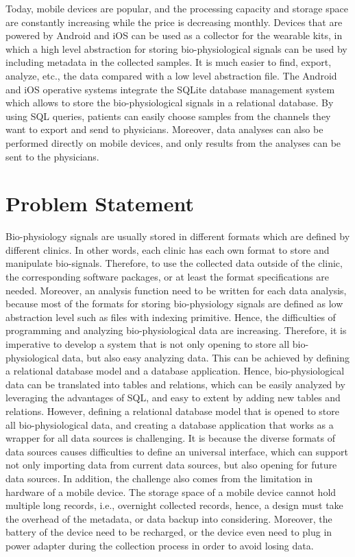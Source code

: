 Today, mobile devices are popular, and the processing capacity and storage space are constantly increasing while the price is decreasing monthly. Devices that are powered by Android and iOS can be used as a collector for the wearable kits, in which a high level abstraction for storing bio-physiological signals can be used by including metadata in the collected samples. It is much easier to find, export, analyze, etc., the data compared with a low level abstraction file. The Android and iOS operative systems integrate the SQLite database management system which allows to store the bio-physiological signals in a relational database. By using SQL queries, patients can easily choose samples from the channels they want to export and send to physicians. Moreover, data analyses can also be performed directly on mobile devices, and only results from the analyses can be sent to the physicians.
\section{Problem Statement}
Bio-physiology signals are usually stored in different formats which are defined by different clinics. In other words, each clinic has each own format to store and manipulate bio-signals. Therefore, to use the collected data outside of the clinic, the corresponding software packages, or at least the format specifications are needed. Moreover, an analysis function need to be written for each data analysis, because most of the formats for storing bio-physiology signals are defined as low abstraction level such as files with indexing primitive. Hence, the difficulties of programming and analyzing bio-physiological data are increasing. Therefore, it is imperative to develop a system that is not only opening to store all bio-physiological data, but also easy analyzing data. This can be achieved by defining a relational database model and a database application. Hence, bio-physiological data can be translated into tables and relations, which can be easily analyzed by leveraging the advantages of SQL, and easy to extent by adding new tables and relations. However, defining a relational database model that is opened to store all bio-physiological data, and creating a database application that works as a wrapper for all data sources is challenging. It is because the diverse formats of data sources causes difficulties to define an universal interface, which can support not only importing data from current data sources, but also opening for future data sources. In addition, the challenge also comes from the limitation in hardware of a mobile device. The storage space of a mobile device cannot hold multiple long records, i.e., overnight collected records, hence, a design must take the overhead of the metadata, or data backup into considering. Moreover, the battery of the device need to be recharged, or the device even need to plug in power adapter during the collection process in order to avoid losing data.
